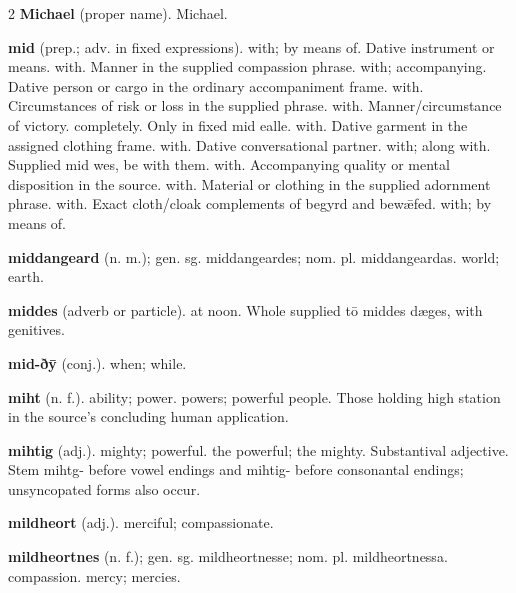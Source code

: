 \begin{multicols*}{2}
\textbf{Michael} (proper name). Michael.\par
\textbf{mid} (prep.; adv. in fixed expressions). with; by means of. Dative instrument or means. with. Manner in the supplied compassion phrase. with; accompanying. Dative person or cargo in the ordinary accompaniment frame. with. Circumstances of risk or loss in the supplied phrase. with. Manner/circumstance of victory. completely. Only in fixed mid ealle. with. Dative garment in the assigned clothing frame. with. Dative conversational partner. with; along with. Supplied mid wes, be with them. with. Accompanying quality or mental disposition in the source. with. Material or clothing in the supplied adornment phrase. with. Exact cloth/cloak complements of begyrd and bewǣfed. with; by means of.\par
\textbf{middangeard} (n. m.); gen. sg. middangeardes; nom. pl. middangeardas. world; earth.\par
\textbf{middes} (adverb or particle). at noon. Whole supplied tō middes dæges, with genitives.\par
\textbf{mid-ðȳ} (conj.). when; while.\par
\textbf{miht} (n. f.). ability; power. powers; powerful people. Those holding high station in the source's concluding human application.\par
\textbf{mihtig} (adj.). mighty; powerful. the powerful; the mighty. Substantival adjective. Stem mihtg- before vowel endings and mihtig- before consonantal endings; unsyncopated forms also occur.\par
\textbf{mildheort} (adj.). merciful; compassionate.\par
\textbf{mildheortnes} (n. f.); gen. sg. mildheortnesse; nom. pl. mildheortnessa. compassion. mercy; mercies.\par

\end{multicols*}
